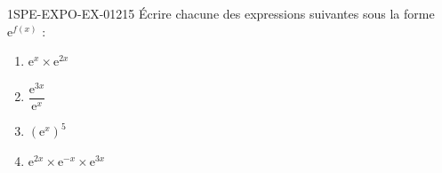 \begin{exercice}{1SPE-EXPO-EX-012}{1}{5}
Écrire chacune des expressions suivantes sous la forme $\mathrm{e}^{f(x)}$ :
\begin{enumerate}
  \item $\mathrm{e}^x \times \mathrm{e}^{2x}$
  \item $\dfrac{\mathrm{e}^{3x}}{\mathrm{e}^x}$
  \item $\left(\mathrm{e}^x\right)^5$
  \item $\mathrm{e}^{2x} \times \mathrm{e}^{-x} \times \mathrm{e}^{3x}$
\end{enumerate}
\end{exercice}
